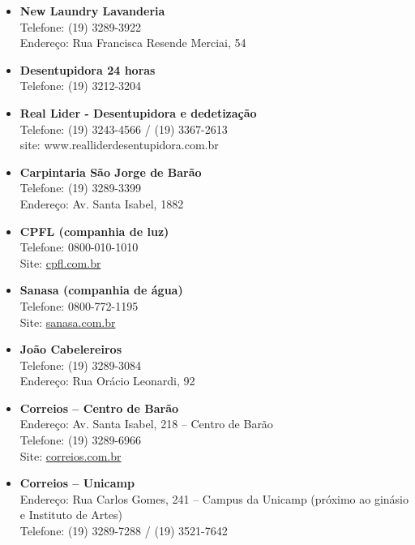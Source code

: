 \begin{itemize}
    \item  \textbf{New Laundry Lavanderia}
        \\Telefone: (19) 3289-3922
        \\Endereço: Rua Francisca Resende Merciai, 54

    \item  \textbf{Desentupidora 24 horas}
        \\Telefone: (19) 3212-3204

    \item  \textbf{Real Lider - Desentupidora e dedetização}
        \\Telefone: (19) 3243-4566 / (19) 3367-2613
        \\site: www.realliderdesentupidora.com.br

    \item  \textbf{Carpintaria São Jorge de Barão}
        \\Telefone: (19) 3289-3399
        \\Endereço: Av. Santa Isabel, 1882

    \item  \textbf{CPFL (companhia de luz)}
        \\Telefone: 0800-010-1010
        \\Site: \url{cpfl.com.br}

    \item  \textbf{Sanasa (companhia de água)}
        \\Telefone: 0800-772-1195
        \\Site: \url{sanasa.com.br}


    \item  \textbf{João Cabelereiros}
        \\Telefone: (19) 3289-3084
        \\Endereço: Rua Orácio Leonardi, 92

    \item  \textbf{Correios -- Centro de Barão}
        \\Endereço: Av. Santa Isabel, 218 -- Centro de Barão
        \\Telefone: (19) 3289-6966
        \\Site: \url{correios.com.br}

    \item  \textbf{Correios -- Unicamp}
        \\Endereço: Rua Carlos Gomes, 241 -- Campus da Unicamp (próximo ao ginásio e Instituto de Artes)
        \\Telefone: (19) 3289-7288 / (19) 3521-7642
\end{itemize}

